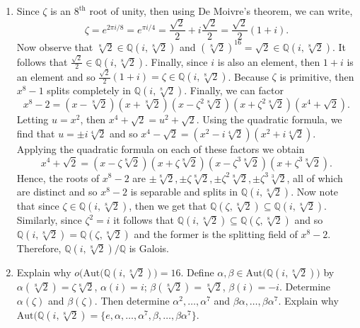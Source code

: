 \documentclass[12pt]{article}
\makeatletter
\theoremstyle{definition}
\theoremstyle{remark}
\newenvironment{solution}[1][\bf{\textit{Solution}}]{\par
  
  \normalfont \topsep6\p@\@plus6\p@\relax
  \list{}{\leftmargin=0mm
          \rightmargin=4mm
          \settowidth{\itemindent}{\itshape#1}%
          \labelwidth=\itemindent
          \parsep=0pt \listparindent=\parindent 
  }
  \item[\hskip\labelsep
        \itshape
    #1\@addpunct{.}]\ignorespaces
}{%
  \popQED\endlist\@endpefalse
}
\makeatother
\begin{document}
\begin{enumerate}[leftmargin=*]
\begin{enumerate}[label=(\alph*)]
                    \begin{solution}
                        Since $\zeta$ is an $8^{\text{th}}$ root of unity, then using De Moivre's theorem, we can write,
                            \begin{equation*}
                                \zeta=e^{2\pi i/8}=e^{\pi i/4}=\frac{\sqrt{2}}{2}+i\frac{\sqrt{2}}{2}=\frac{\sqrt{2}}{2}(1+i).
                            \end{equation*}
                        Now observe that $\sqrt[8]{2}\in\mathbb{Q}(i,\sqrt[8]{2})$ and $(\sqrt[8]{2})^{16}=\sqrt{2}\in\mathbb{Q}(i,\sqrt[8]{2})$. It follows that $\frac{\sqrt{2}}{2}\in\mathbb{Q}(i,\sqrt[8]{2})$. Finally, since $i$ is also an element, then $1+i$ is an element and so $\frac{\sqrt{2}}{2}(1+i)=\zeta\in\mathbb{Q}(i,\sqrt[8]{2})$. Because $\zeta$ is primitive, then $x^8-1$ splits completely in $\mathbb{Q}(i,\sqrt[8]{2})$. Finally, we can factor
                            \begin{equation*}
                                x^8-2=(x-\sqrt[8]{2})(x+\sqrt[8]{2})(x-\zeta^2\sqrt[8]{2})(x+\zeta^2\sqrt[8]{2})(x^4+\sqrt{2}).
                            \end{equation*}
                        Letting $u=x^2$, then $x^4+\sqrt{2}=u^2+\sqrt{2}$. Using the quadratic formula, we find that $u=\pm i\sqrt[4]{2}$ and so $x^4-\sqrt{2}=(x^2-i\sqrt[4]{2})(x^2+i\sqrt[4]{2})$. Applying the quadratic formula on each of these factors we obtain
                            \begin{equation*}
                                x^4+\sqrt{2}=(x-\zeta\sqrt[8]{2})(x+\zeta\sqrt[8]{2})(x-\zeta^3\sqrt[8]{2})(x+\zeta^3\sqrt[8]{2}).
                            \end{equation*}
                        Hence, the roots of $x^8-2$ are $\pm\sqrt[8]{2},\pm\zeta\sqrt[8]{2},\pm\zeta^2\sqrt[8]{2},\pm\zeta^3\sqrt[3]{2}$, all of which are distinct and so $x^8-2$ is separable and splits in $\mathbb{Q}(i,\sqrt[8]{2})$. Now note that since $\zeta\in\mathbb{Q}(i,\sqrt[8]{2})$, then we get that $\mathbb{Q}(\zeta,\sqrt[8]{2})\subseteq\mathbb{Q}(i,\sqrt[8]{2})$. Similarly, since $\zeta^2=i$ it follows that $\mathbb{Q}(i,\sqrt[8]{2})\subseteq\mathbb{Q}(\zeta,\sqrt[8]{2})$ and so $\mathbb{Q}(i,\sqrt[8]{2})=\mathbb{Q}(\zeta,\sqrt[8]{2})$ and the former is the splitting field of $x^8-2$. Therefore, $\mathbb{Q}(i,\sqrt[8]{2})/\mathbb{Q}$ is Galois.
                    \end{solution}\newpage
                \item Explain why $o\big(\text{Aut}(\mathbb{Q}(i,\sqrt[8]{2})\big)=16$. Define $\alpha,\beta\in\text{Aut}\big(\mathbb{Q}(i,\sqrt[8]{2})\big)$ by $\alpha(\sqrt[8]{2})=\zeta\sqrt[8]{2}$, $\alpha(i)=i$; $\beta(\sqrt[8]{2})=\sqrt[8]{2}$, $\beta(i)=-i$. Determine $\alpha(\zeta)$ and $\beta(\zeta)$. Then determine $\alpha^2,\dots,\alpha^7$ and $\beta\alpha,\dots,\beta\alpha^7$. Explain why $\text{Aut}(\mathbb{Q}(i,\sqrt[8]{2})=\{e,\alpha,\dots,\alpha^7,\beta,\dots,\beta\alpha^7\}$.

\end{enumerate}
\end{enumerate}
\end{document}
